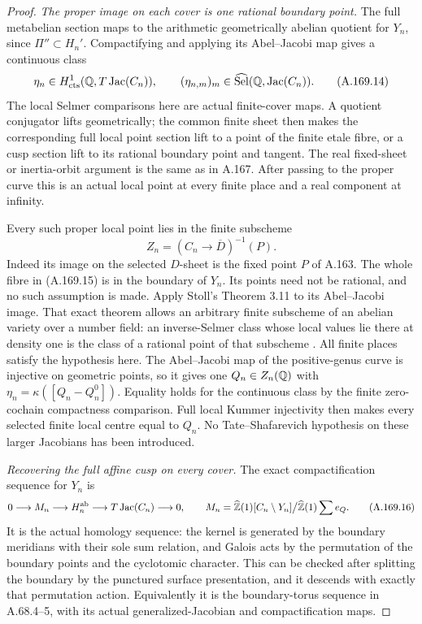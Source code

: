 \begin{proof}
\emph{The proper image on each cover is one rational boundary point.}
The full metabelian section maps to the arithmetic geometrically
abelian quotient for \(Y_n\), since \(\Pi''\subset H_n'\).
Compactifying and applying its Abel--Jacobi map gives a continuous
class
\[
       \eta_n\in H^1_{\rm cts}(\mathbb Q,T\operatorname{Jac}(C_n)),
                \qquad (\eta_{n,m})_m\in
                         \widehat{\operatorname{Sel}}(\mathbb Q,
                                      \operatorname{Jac}(C_n)).
\tag{A.169.14}
\]
The local Selmer comparisons here are actual finite-cover maps.
A quotient conjugator lifts geometrically; the common finite sheet
then makes the corresponding full local point section lift to a
point of the finite etale fibre, or a cusp section lift to its
rational boundary point and tangent.  The real fixed-sheet or
inertia-orbit argument is the same as in A.167.  After passing to
the proper curve this is an actual local point at every finite
place and a real component at infinity.

Every such proper local point lies in the finite subscheme
\[
                         Z_n=(C_n\longrightarrow\overline D)^{-1}(P).
\tag{A.169.15}
\]
Indeed its image on the selected \(D\)-sheet is the fixed point
\(P\) of A.163.  The whole fibre in (A.169.15) is in the
boundary of \(Y_n\).  Its points need not be rational, and no such
assumption is made.  Apply Stoll's Theorem 3.11 to its Abel--Jacobi
image.  That exact theorem allows an arbitrary finite subscheme of
an abelian variety over a number field: an inverse-Selmer class
whose local values lie there at density one is the class of a
rational point of that subscheme
\cite[Theorem 3.11, p.~11 of the author version]{LegStoll2007}.
All finite places satisfy the hypothesis here.  The Abel--Jacobi
map of the positive-genus curve is injective on geometric points,
so it gives one \(Q_n\in Z_n(\mathbb Q)\) with
\(\eta_n=\kappa([Q_n-Q_n^0])\).  Equality holds for the
continuous class by the finite zero-cochain compactness comparison.
Full local Kummer injectivity then makes every selected finite
local centre equal to \(Q_n\).  No Tate--Shafarevich hypothesis
on these larger Jacobians has been introduced.

\emph{Recovering the full affine cusp on every cover.}
The exact compactification sequence for \(Y_n\) is
\[
 0\longrightarrow M_n\longrightarrow H_n^{\rm ab}
           \longrightarrow T\operatorname{Jac}(C_n)\longrightarrow0,
 \qquad
 M_n=\widehat{\mathbb Z}(1)[C_n\setminus Y_n]\big/
                    \widehat{\mathbb Z}(1)\sum e_Q.
\tag{A.169.16}
\]
It is the actual homology sequence: the kernel is generated by the
boundary meridians with their sole sum relation, and Galois acts by
the permutation of the boundary points and the cyclotomic character.
This can be checked after splitting the boundary by the punctured
surface presentation, and it descends with exactly that permutation
action.  Equivalently it is the boundary-torus sequence in A.68.4--5,
with its actual generalized-Jacobian and compactification maps.


\end{proof}
